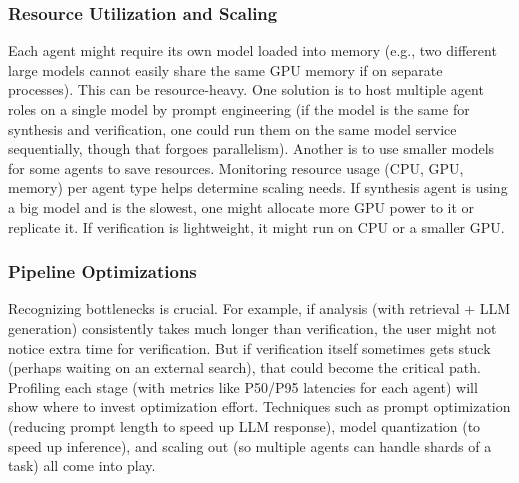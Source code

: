 \subsubsection*{Resource Utilization and Scaling}
Each agent might require its own model loaded into memory (e.g., two different large models cannot easily share the same GPU memory if on separate processes). This can be resource-heavy. One solution is to host multiple agent roles on a single model by prompt engineering (if the model is the same for synthesis and verification, one could run them on the same model service sequentially, though that forgoes parallelism). Another is to use smaller models for some agents to save resources. Monitoring resource usage (CPU, GPU, memory) per agent type helps determine scaling needs. If synthesis agent is using a big model and is the slowest, one might allocate more GPU power to it or replicate it. If verification is lightweight, it might run on CPU or a smaller GPU.

\subsubsection*{Pipeline Optimizations}
Recognizing bottlenecks is crucial. For example, if analysis (with retrieval + LLM generation) consistently takes much longer than verification, the user might not notice extra time for verification. But if verification itself sometimes gets stuck (perhaps waiting on an external search), that could become the critical path. Profiling each stage (with metrics like P50/P95 latencies for each agent) will show where to invest optimization effort. Techniques such as prompt optimization (reducing prompt length to speed up LLM response), model quantization (to speed up inference), and scaling out (so multiple agents can handle shards of a task) all come into play.


